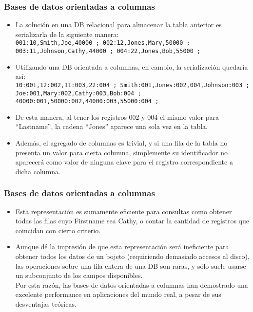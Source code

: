\begin{frame}
\frametitle{Bases de datos orientadas a columnas}
\begin{itemize}
\item	La solución en una DB relacional para almacenar la tabla anterior es serializarla de la siguiente manera: \\
		\texttt{001:10,Smith,Joe,40000 ; 002:12,Jones,Mary,50000 ; 003:11,Johnson,Cathy,44000 ; 004:22,Jones,Bob,55000 ;}
		\pause
\item	Utilizando una DB orientada a columnas, en cambio, la serialización quedaría así: \\
		\texttt{10:001,12:002,11:003,22:004 ; Smith:001,Jones:002,004,Johnson:003 ; Joe:001,Mary:002,Cathy:003,Bob:004 ; 40000:001,50000:002,44000:003,55000:004 ;}
		\pause
\item	De esta manera, al tener los registros 002 y 004 el mismo valor para ``Lastname'', la cadena ``Jones'' aparece una sola vez en la tabla. \pause
\item	Además, el agregado de columnas es trivial, y si una fila de la tabla no presenta un valor para cierta columna, simplemente su identificador no aparecerá como valor de ninguna clave para el registro correspondiente a dicha columna.
\end{itemize}
\end{frame}

\begin{frame}
\frametitle{Bases de datos orientadas a columnas}
\begin{itemize}
\item	Esta representación es sumamente eficiente para consultas como obtener todas las filas cuyo Firstname sea Cathy, o contar la cantidad de registros que coincidan con cierto criterio. \pause
\item	Aunque dé la impresión de que esta representación será ineficiente para obtener todos los datos de un bojeto (requiriendo demasiado accesos al disco), las operaciones sobre una fila entera de una DB son raras, y sólo suele usarse un subconjunto de los campos disponibles. \pause \\
		Por esta razón, las bases de datos orientadas a columnas han demostrado una excelente performance en aplicaciones del mundo real, a pesar de sus desventajas teóricas.
\end{itemize}
\end{frame}
